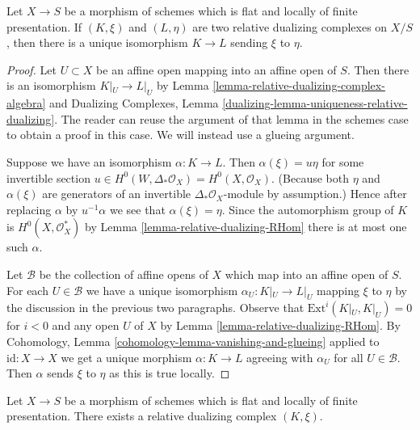 \begin{lemma}
\label{lemma-uniqueness-relative-dualizing}
Let $X \to S$ be a morphism of schemes which is flat and
locally of finite presentation. If $(K, \xi)$ and $(L, \eta)$
are two relative dualizing complexes on $X/S$, then there is a unique
isomorphism $K \to L$ sending $\xi$ to $\eta$.
\end{lemma}

\begin{proof}
Let $U \subset X$ be an affine open mapping into an
affine open of $S$. Then there is an isomorphism
$K|_U \to L|_U$ by Lemma \ref{lemma-relative-dualizing-complex-algebra} and
Dualizing Complexes, Lemma
\ref{dualizing-lemma-uniqueness-relative-dualizing}.
The reader can reuse the argument of that lemma
in the schemes case to obtain a proof in this case.
We will instead use a glueing argument.

\medskip\noindent
Suppose we have an isomorphism $\alpha : K \to L$.
Then $\alpha(\xi) = u \eta$ for some invertible section
$u \in H^0(W, \Delta_*\mathcal{O}_X) = H^0(X, \mathcal{O}_X)$.
(Because both $\eta$ and $\alpha(\xi)$ are generators
of an invertible $\Delta_*\mathcal{O}_X$-module by assumption.)
Hence after replacing $\alpha$ by $u^{-1}\alpha$
we see that $\alpha(\xi) = \eta$.
Since the automorphism group of
$K$ is $H^0(X, \mathcal{O}_X^*)$ by Lemma \ref{lemma-relative-dualizing-RHom}
there is at most one such $\alpha$.

\medskip\noindent
Let $\mathcal{B}$ be the collection of affine opens of
$X$ which map into an affine open of $S$. For each $U \in \mathcal{B}$
we have a unique isomorphism $\alpha_U : K|_U \to L|_U$
mapping $\xi$ to $\eta$ by the discussion in the previous
two paragraphs.
Observe that $\text{Ext}^i(K|_U, K|_U) = 0$ for $i < 0$
and any open $U$ of $X$ by Lemma \ref{lemma-relative-dualizing-RHom}.
By Cohomology, Lemma \ref{cohomology-lemma-vanishing-and-glueing}
applied to $\text{id} : X \to X$ we get a unique morphism
$\alpha : K \to L$ agreeing
with $\alpha_U$ for all $U \in \mathcal{B}$.
Then $\alpha$ sends $\xi$ to $\eta$ as this is true locally.
\end{proof}

\begin{lemma}
\label{lemma-existence-relative-dualizing}
Let $X \to S$ be a morphism of schemes which is
flat and locally of finite presentation.
There exists a relative dualizing complex $(K, \xi)$.
\end{lemma}

